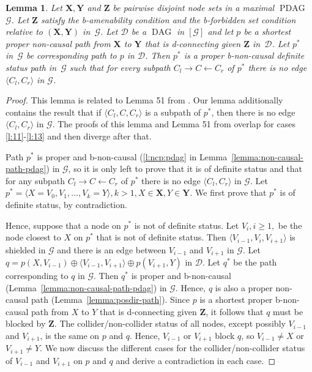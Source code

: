 \documentclass[letterpaper]{article}
\newtheorem{lemma}[theorem]{Lemma}
\theoremstyle{definition}
\theoremstyle{remark}
\DeclareMathOperator{\PDAG}{PDAG}
\DeclareMathOperator{\DAG}{DAG}
\newcommand{\bamen}{the b-amenability condition}
\newcommand{\bforb}{the b-forbidden set condition}
\newcommand{\mpdag}{maximal $\PDAG$}
\newcommand{\g}[1][G]{\mathcal{#1}}
\newcommand{\pstar}[1][p]{{#1}^{*}}
\begin{document}
\begin{lemma}
Let $\mathbf{X,Y}$ and $\mathbf{Z}$ be pairwise disjoint node sets in a \mpdag{} $\g$. Let $\mathbf{Z}$ satisfy \bamen{} and \bforb{} relative to $(\mathbf{X},\mathbf{Y})$ in~$\g$. Let $\g[D]$ be a $\DAG$ in $[\g]$ and let $p$ be a shortest proper non-causal path from $\mathbf{X}$ to $\mathbf{Y}$ that is d-connecting given $\mathbf{Z}$ in~$\g[D]$. Let $\pstar$ in~$\g$ be corresponding path to $p$ in $\g[D]$. Then $\pstar$ is a proper b-non-causal definite status path in~$\g$ such that for every subpath $C_l \rightarrow C \leftarrow C_r$ of $\pstar$ there is no edge $\langle C_l,C_r\rangle$ in $\g$.
   \label{lemma:1-pdag}
\end{lemma}

\begin{proof}
This lemma is related to Lemma 51 from \cite{perkovic16}. 
Our lemma additionally contains the result that if $\langle C_l,C,C_r \rangle$ is a subpath of $\pstar$, then there is no edge $\langle C_l,C_r \rangle $ in $\g$. The proofs of this lemma and Lemma 51 from \cite{perkovic16} overlap for cases \ref{l:11}-\ref{l:13} and then diverge after that. 

Path $\pstar$ is proper and b-non-causal (\ref{l:ncp:pdag} in Lemma~\ref{lemma:non-causal-path-pdag}) in $\g$, so it is only left to prove that it is of definite status and that for any subpath $C_l \rightarrow C \leftarrow C_r$ of $\pstar$ there is no edge $\langle C_l,C_r\rangle$ in $\g$.
Let  $\pstar = \langle X = V_{0}, V_{1},\dots ,V_{k} = Y \rangle, k > 1, X \in \mathbf{X}, Y \in \mathbf{Y}$. We first prove that $\pstar$ is of definite status, by contradiction.

Hence, suppose that a node on $\pstar$ is not of definite status. Let $V_i, i\ge 1,$ be the node closest to $X$ on $\pstar$ that is not of definite status.
Then  $\langle V_{i-1}, V_{i}, V_{i+1} \rangle$ is shielded in $\g$ and there is an edge between $V_{i-1}$ and $V_{i+1}$ in $\g$. Let $q = p(X,V_{i-1}) \oplus \langle V_{i-1} , V_{i+1} \rangle \oplus p(V_{i+1},Y)$ in $\g[D]$. Let $\pstar[q]$ be the path corresponding to $q$ in $\g$. Then $\pstar[q]$ is proper and b-non-causal (Lemma~\ref{lemma:non-causal-path-pdag}) in $\g$. Hence, $q$ is also a proper non-causal path (Lemma~\ref{lemma:posdir-path}). Since $p$ is a shortest proper b-non-causal path from $X$ to $Y$ that is d-connecting given $\mathbf{Z}$, it follows that $q$ must be blocked by $\mathbf{Z}$.
The collider/non-collider status of all nodes, except possibly $V_{i-1}$ and $V_{i+1}$, is the same on $p$ and $q$. Hence, $V_{i-1}$ or $V_{i+1}$ block $q$, so $V_{i-1} \neq X$ or $V_{i+1} \neq Y$.
We now discuss the different cases for the collider/non-collider status of $V_{i-1}$ and $V_{i+1}$ on $p$ and $q$ and derive a contradiction in each case.


\end{proof}
\end{document}
